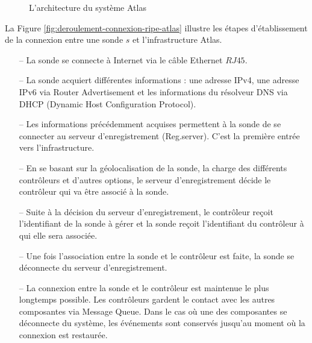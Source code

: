 \begin{figure}[h]
	\centering
	\resizebox{\textwidth}{!}{
		 
	}
	\caption{L'architecture du système  Atlas}
	\label{fig:archi-ripe-atlas}
\end{figure}

La Figure \ref{fig:deroulement-connexion-ripe-atlas} illustre les étapes d'établissement de la connexion entre une sonde $s$  et  l'infrastructure  Atlas.
\begin{itemize}
	\item[--]  La sonde  se connecte à Internet via  le câble Ethernet $RJ45$.
	\item[--]   La sonde  acquiert différentes informations : une adresse IPv4, une adresse IPv6 via Router Advertisement et les informations du résolveur DNS via DHCP (Dynamic Host Configuration Protocol). 
	
	\item[--]  Les informations précédemment acquises permettent à la sonde  de se connecter  au serveur d'enregistrement (Reg.server). C'est la première entrée vers l'infrastructure.
	
	\item[--]  En se basant sur la géolocalisation de la sonde, la charge des différents contrôleurs et d'autres options,  le serveur d'enregistrement décide le contrôleur qui va  être associé à la sonde. 
	
	\item[--]  Suite à la décision du serveur d'enregistrement, le contrôleur reçoit l'identifiant de la sonde  à gérer et la sonde  reçoit l'identifiant du contrôleur  à qui elle sera associée.
	
	\item[--]  Une fois l'association entre la sonde  et le contrôleur est faite,  la sonde  se déconnecte du serveur d'enregistrement.
	
	\item[--]  La connexion entre la sonde  et le contrôleur est  maintenue le plus longtemps possible. Les contrôleurs gardent le contact avec les autres composantes via Message Queue. Dans le cas où  une des composantes se déconnecte du système, les événements sont conservés jusqu'au moment où la connexion est restaurée.
	
\end{itemize}

